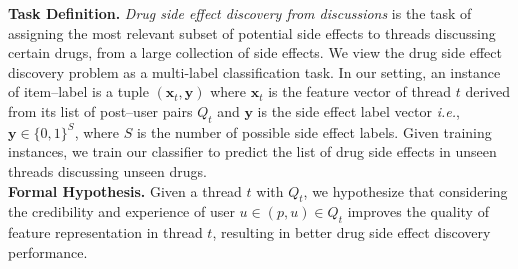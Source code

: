 \documentclass{bmcart}
\begin{document}
{\bf Task Definition.} 
{\it Drug side effect discovery from discussions} 
is the task of assigning the most relevant subset of potential
side effects to threads discussing certain drugs, from a large
collection of side effects. We view the drug side effect
discovery problem as a multi-label classification task. In our
setting, an instance of item--label is a tuple
$\left(\boldsymbol{x}_{t},\boldsymbol{y}\right)$ where
$\boldsymbol{x}_{t}$ is the feature vector of thread $t$ derived from
its list of
post--user pairs $Q_{t}$
and $\boldsymbol{y}$ is the side effect label vector \textit{i.e.}, $\boldsymbol{y}\in\{0, 1\}^S$, where $S$ is the number of possible side effect labels. Given training instances, we train our classifier to predict the list of drug side effects in unseen threads discussing unseen drugs. \\


{\bf Formal Hypothesis.} Given a thread $t$ with $Q_t$, 
we hypothesize that considering the credibility and experience of user $u \in \left(p, u\right) \in Q_t$ improves the quality of feature representation in thread $t$, resulting in better drug side effect discovery performance. \\
\end{document}
